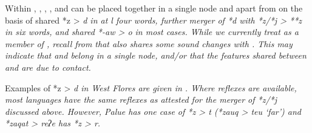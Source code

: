 Within ,
, , , and  can be placed together
in a single node
and apart from  on the basis of shared *z
> \it{d} in at l four words,
further merger of *d with *z/*j > **z in six words,
and shared *-aw > \it{o} in most cases.
While we currently treat  as a member of ,
recall from  that  also shares some sound changes with .
This may indicate that 
and  belong in a single node,
and/or that the features shared between 
and  are due to contact.

Examples of *z > \it{d} in West Flores are given in .
Where reflexes are available,
most  languages have the same reflexes as
attested for the merger of *z/*j discussed above.
However, Palu{\Q}e has one case of *z > \it{t} (*zauq > \it{teu}
‘far’) and  *zaqat > \it{reʔe} has *z > \it{r}.

